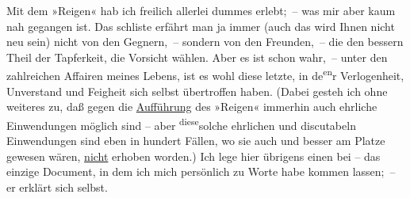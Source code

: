 \pstart
           Mit dem »Reigen« hab ich freilich allerlei
               dummes erlebt; – was mir aber kaum nah gegangen ist. Das schli{\geminationm}ste erfährt man ja immer (auch das wird Ihnen nicht neu
               sein) nicht von den Gegnern, – sondern von den Freunden, – die den bessern Theil der
               Tapferkeit, die Vorsicht wählen. Aber es ist schon wahr, – unter den zahlreichen
               Affairen meines Lebens, ist es wohl diese letzte, in de\substVorne{}\textsuperscript{en}\substDazwischen{}r\substHinten{} Verlogenheit, Unverstand und Feigheit sich selbst übertroffen haben. (Dabei
               gesteh ich ohne weiteres zu, daß gegen die \uline{Aufführung}
               des »Reigen« immerhin auch ehrliche Einwendungen
               möglich sind – aber \substVorne{}\textsuperscript{diese}\substDazwischen{}solche\substHinten{} ehrlichen und discutabeln Einwendungen sind eben in hundert Fällen, wo sie
               auch und besser am Platze gewesen wären, \uline{nicht}
               erhoben worden.) Ich lege hier übrigens einen \label{K_L02376-2v}\label{K_L02376-2} bei – das einzige Document, in dem ich 
               mich \introOben{}persönlich\introOben{} zu Worte habe kommen lassen; – er erklärt
               sich selbst.\pend
           
